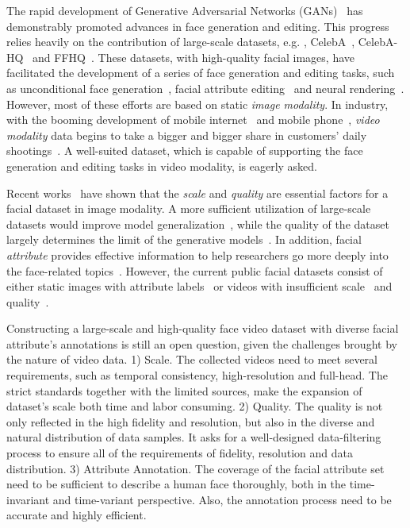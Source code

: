 \begin{sloppypar}

The rapid development of Generative Adversarial Networks (GANs)~\cite{gan,dcgan,celebahq,stylegan,stylegan2,stylegan3} has demonstrably promoted advances in face generation and editing. This progress relies heavily on the contribution of large-scale datasets, e.g. , CelebA~\cite{celeba15}, CelebA-HQ~\cite{celebahq} and FFHQ~\cite{stylegan}. These datasets, with high-quality facial images, have facilitated the development of a series of face generation and editing tasks, such as unconditional face generation~\cite{gan,dcgan,stylegan,stylegan2,mocoganhd,digan,styleganv,DBLP:conf/nips/JiangDWL21}, facial attribute editing~\cite{starganv2,munit,interfacegan,e4e,xu2022transeditor} and neural rendering~\cite{headnerf,stylenerf,or2021stylesdf,chan2021pigan,or2021stylesdf,eg3d,guo2021adnerf,Gafni_2021_CVPR,chen2022sem2nerf}. However, most of these efforts are based on static \textit{image modality}. In industry, with the booming development of mobile internet~\cite{iotsurvey} and mobile phone~\cite{yang2019analysis}, \textit{video modality} data begins to take a bigger and bigger share in customers' daily shootings~\cite{snapchat,tiktok}. A well-suited dataset, which is capable of supporting the face generation and editing tasks in video modality, is eagerly asked.
\end{sloppypar}

Recent works~\cite{stylegan2,brock2018large} have shown that the \textit{scale} and \textit{quality} are essential factors for a facial dataset in image modality. A more sufficient utilization of large-scale datasets would improve model generalization~\cite{schmidt2018adversarially}, while the quality of the dataset largely determines the limit of the generative models~\cite{dcgan,stylegan,stylegan2,mocoganhd,digan,styleganv}. In addition, facial \textit{attribute} provides effective information to help researchers go more deeply into the face-related topics~\cite{celeba15,munit,starganv2,interfacegan}. However, the current public facial datasets consist of either static images with attribute labels~\cite{celeba15,celebahq} or videos with insufficient scale~\cite{mead} and quality~\cite{vox17,vox2}.

Constructing a large-scale and high-quality face video dataset with diverse facial attribute's annotations is still an open question, given the challenges brought by the nature of video data. 1) Scale. The collected videos need to meet several requirements, such as temporal consistency, high-resolution and full-head. The strict standards together with the limited sources, make the expansion of dataset's scale both time and labor consuming. 2) Quality. The quality is not only reflected in the high fidelity and resolution, but also in the diverse and natural distribution of data samples. It asks for a well-designed data-filtering process to ensure all of the requirements of fidelity, resolution and data distribution. 3) Attribute Annotation. The coverage of the facial attribute set need to be sufficient to  describe a human face thoroughly, both in the time-invariant and time-variant perspective. Also, the annotation process need to be accurate and highly efficient.

